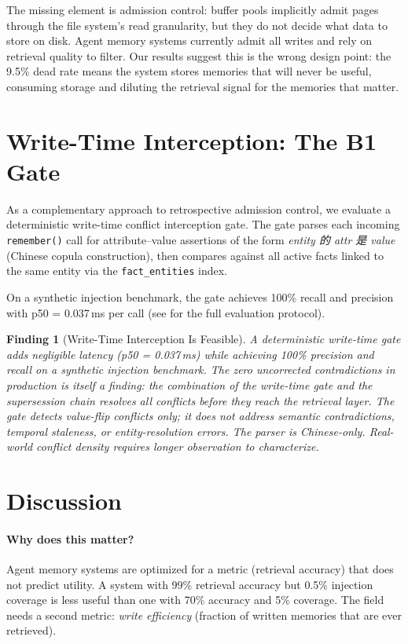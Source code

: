 \documentclass[10pt,twocolumn]{article}
\newtheorem{finding}{Finding}
\begin{document}
The missing element is admission control: buffer pools implicitly admit pages through the file system's read granularity, but they do not decide what data to store on disk. Agent memory systems currently admit all writes and rely on retrieval quality to filter. Our results suggest this is the wrong design point: the 9.5\% dead rate means the system stores memories that will never be useful, consuming storage and diluting the retrieval signal for the memories that matter.

\section{Write-Time Interception: The B1 Gate}
\label{sec:b1}

As a complementary approach to retrospective admission control, we evaluate a deterministic write-time conflict interception gate. The gate parses each incoming \texttt{remember()} call for attribute--value assertions of the form \emph{entity 的 attr 是 value} (Chinese copula construction), then compares against all active facts linked to the same entity via the \texttt{fact\_entities} index.

On a synthetic injection benchmark, the gate achieves 100\% recall and precision with p50 = 0.037\,ms per call (see \cite{companionjss} for the full evaluation protocol).

\begin{finding}[Write-Time Interception Is Feasible]
A deterministic write-time gate adds negligible latency (p50 = 0.037\,ms) while achieving 100\% precision and recall on a synthetic injection benchmark. The zero uncorrected contradictions in production is itself a finding: the combination of the write-time gate and the supersession chain resolves all conflicts before they reach the retrieval layer. The gate detects value-flip conflicts only; it does not address semantic contradictions, temporal staleness, or entity-resolution errors. The parser is Chinese-only. Real-world conflict density requires longer observation to characterize.
\end{finding}

\section{Discussion}

\paragraph{Why does this matter?} Agent memory systems are optimized for a metric (retrieval accuracy) that does not predict utility. A system with 99\% retrieval accuracy but 0.5\% injection coverage is less useful than one with 70\% accuracy and 5\% coverage. The field needs a second metric: \emph{write efficiency} (fraction of written memories that are ever retrieved).
\end{document}
